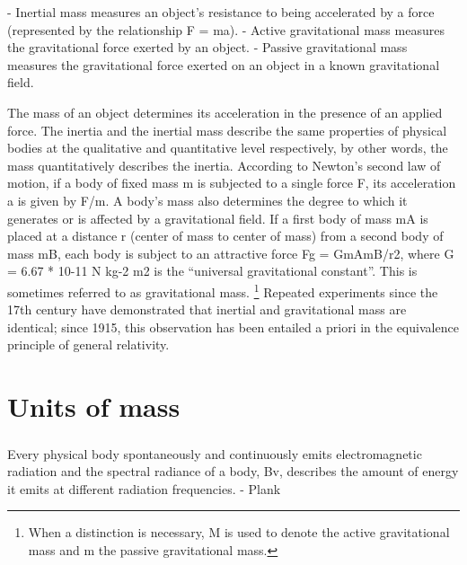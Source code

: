 \documentclass{book}
\begin{document}
    - Inertial mass measures an object's resistance to being accelerated by a force (represented by the relationship F = ma).
    - Active gravitational mass measures the gravitational force exerted by an object.
    - Passive gravitational mass measures the gravitational force exerted on an object in a known gravitational field.
        
    
    The mass of an object determines its acceleration in the presence of an applied force. The inertia and the inertial mass describe the same properties of physical bodies at the qualitative and quantitative level respectively, by other words, the mass quantitatively describes the inertia. According to Newton's second law of motion, if a body of fixed mass m is subjected to a single force F, its acceleration a is given by F/m. A body's mass also determines the degree to which it generates or is affected by a gravitational field. If a first body of mass mA is placed at a distance r (center of mass to center of mass) from a second body of mass mB, each body is subject to an attractive force Fg = GmAmB/r2, where G = 6.67 * 10{-11} N kg{-2} m2 is the ``universal gravitational constant''. This is sometimes referred to as gravitational mass.  \footnote{When a distinction is necessary, M is used to denote the active gravitational mass and m the passive gravitational mass.} Repeated experiments since the 17th century have demonstrated that inertial and gravitational mass are identical; since 1915, this observation has been entailed a priori in the equivalence principle of general relativity.
    
    \chapter{Units of mass}

    \paragraph{}
    Every physical body spontaneously and continuously emits electromagnetic radiation and the spectral radiance of a body, Bv, describes the amount of energy it emits at different radiation frequencies. - Plank
    
\end{document}
